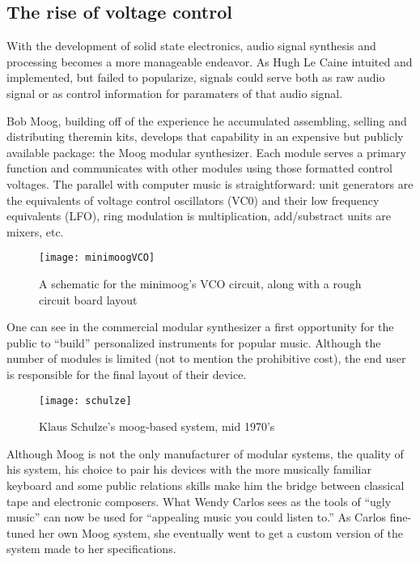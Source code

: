 \begin{itemize}
\subsection{The rise of voltage control}

With the development of solid state electronics, audio signal synthesis and processing becomes a more manageable endeavor. As Hugh Le Caine intuited and implemented, but failed to popularize, signals could serve both as raw audio signal or as control information for paramaters of that audio signal. 

Bob Moog, building off of the experience he accumulated assembling, selling and distributing theremin kits, develops that capability in an expensive but publicly available package: the Moog modular synthesizer. Each module serves a primary function and communicates with other modules using those formatted control voltages. The parallel with computer music is straightforward: unit generators are the equivalents of voltage control oscillators (VC0) and their low frequency equivalents (LFO), ring modulation is multiplication, add/substract units are mixers, etc. 

	\begin{figure}[h!]
	  \caption{A schematic for the minimoog's VCO circuit, along with a rough circuit board layout}
	  \centering
	    \texttt{[image: minimoogVCO]}
	\end{figure}

One can see in the commercial modular synthesizer a first opportunity for the public to ``build'' personalized instruments for popular music. Although the number of modules is limited (not to mention the prohibitive cost), the end user is responsible for the final layout of their device. 

	\begin{figure}[h!]
	  \caption{Klaus Schulze's moog-based system, mid 1970's}
	  \centering
	    \texttt{[image: schulze]}
	\end{figure}

Although Moog is not the only manufacturer of modular systems, the quality of his system, his choice to pair his devices with the more musically familiar keyboard and some public relations skills make him the bridge between classical tape and electronic composers. What Wendy Carlos sees as the tools of ``ugly music'' can now be used for ``appealing music you could listen to.'' \cite[p.169]{holmes2002} As Carlos fine-tuned her own Moog system, she eventually went to get a custom version of the system made to her specifications. 


\end{itemize}

